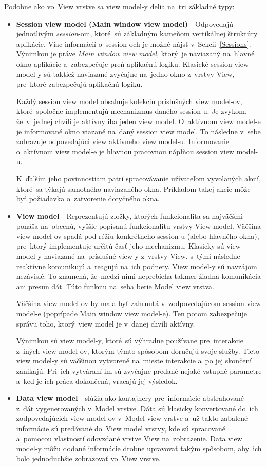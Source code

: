Podobne ako vo~View vrstve sa view model-y delia na~tri základné typy:
\begin{itemize}
    \item \textbf{Session view model (Main window view model)} - Odpovedajú jednotlivým \textit{session}-om, ktoré~sú základným kameňom vertikálnej štruktúry aplikácie. Viac informácií o~session-och je možné nájsť v~Sekcii~\ref{Sessions}. Výnimkou je práve \textit{Main window view model}, ktorý~je naviazaný na~hlavné okno aplikácie a~zabezpečuje preň aplikačnú logiku. Klasické session view model-y sú taktiež naviazané zvyčajne na~jedno okno z~vrstvy View, pre~ktoré zabezpečujú aplikačnú logiku.
    
    Každý session view model obsahuje kolekciu príslušných view model-ov, ktoré~spoločne implementujú mechanizmus daného session-u. Je zvykom, že~v~jednej chvíli je aktívny iba jeden view model. O~aktívnom view model-e je informované okno viazané na~daný session view model. To následne v~sebe zobrazuje odpovedajúci view aktívneho view model-u. Informovanie o~aktívnom view model-e je hlavnou pracovnou náplňou session view model-u.

    K~ďalším jeho povinnostiam patrí spracovávanie užívateľom vyvolaných akcií, ktoré~sa týkajú samotného naviazaného okna. Príkladom takej akcie môže byť požiadavka o~zatvorenie dotyčného okna.
    \item \textbf{View model} - Reprezentujú zložky, ktorých funkcionalita sa najväčšmi ponáša na~obecnú, vyššie popísanú funkcionalitu vrstvy View model. Väčšina view model-ov spadá pod réžiu konkrétneho session-u (alebo hlavného okna), pre~ktorý implementuje určitú časť jeho mechanizmu. Klasicky sú view model-y naviazané na~príslušné view-y z~vrstvy View. s~tými následne reaktívne komunikujú a~reagujú na~ich podnety. View model-y sú navzájom nezávislé. To znamená, že~medzi nimi neprebieha takmer žiadna komunikácia ani presun dát. Túto funkciu na~seba berie Model view vrstva.

    Väčšina view model-ov by mala byť zahrnutá v~zodpovedajúcom session view model-e (poprípade Main window view model-e). Ten potom zabezpečuje správu toho, ktorý~view model je v~danej chvíli aktívny. 
    
    Výnimkou sú view model-y, ktoré~sú výhradne používane pre~interakcie z~iných view model-ov, ktorým týmto spôsobom doručujú svoje služby. Tieto view model-y sú väčšinou vytvorené na~mieste interakcie a~po jej skončení zanikajú. Pri~ich vytváraní im sú zvyčajne predané nejaké vstupné parametre a~keď je ich práca dokončená, vracajú jej výsledok. 
    \item \textbf{Data view model} - slúžia ako kontajnery pre~informácie abstrahované z~dát vygenerovaných v~Model vrstve. Dáta sú klasicky konvertované do~ich zodpovedajúcich view model-ov v~Model view vrstve a~už takto zabalené informácie sú predávané do~View model vrstvy, kde sú spracované a~pomocou vlastností odovzdané vrstve View na~zobrazenie. Data view model-y môžu dodané informácie drobne upravovať takým spôsobom, aby~ich bolo jednoduchšie zobrazovať vo~View vrstve.
    

\end{itemize}
